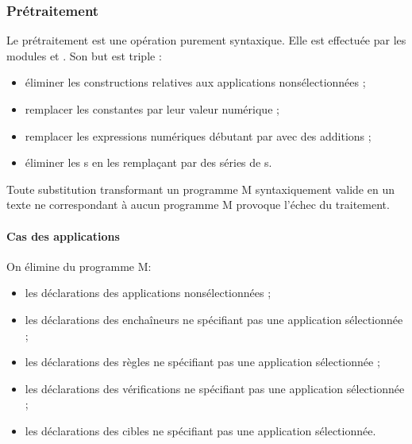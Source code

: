 \documentclass[letterpaper,10pt,french]{sphinxmanual}
\begin{document}
\subsubsection{Pré\sphinxhyphen{}traitement}
\label{\detokenize{mlang:pre-traitement}}
\sphinxAtStartPar
Le prétraitement est une opération purement syntaxique. Elle est effectuée par
les modules  et . Son but est triple :
\begin{itemize}
\item {} 
\sphinxAtStartPar
éliminer les constructions relatives aux applications non\sphinxhyphen{}sélectionnées ;

\item {} 
\sphinxAtStartPar
remplacer les constantes par leur valeur numérique ;

\item {} 
\sphinxAtStartPar
remplacer les expressions numériques débutant par  avec des
additions ;

\item {} 
\sphinxAtStartPar
éliminer les s en les remplaçant par des séries de s.

\end{itemize}

\sphinxAtStartPar
Toute substitution transformant un programme M syntaxiquement valide en un
texte ne correspondant à aucun programme M provoque l’échec du traitement.


\paragraph{Cas des applications}
\label{\detokenize{mlang:cas-des-applications}}
\sphinxAtStartPar
On élimine du programme M:
\begin{itemize}
\item {} 
\sphinxAtStartPar
les déclarations des applications non\sphinxhyphen{}sélectionnées ;

\item {} 
\sphinxAtStartPar
les déclarations des enchaîneurs ne spécifiant pas une application
sélectionnée ;

\item {} 
\sphinxAtStartPar
les déclarations des règles ne spécifiant pas une application
sélectionnée ;

\item {} 
\sphinxAtStartPar
les déclarations des vérifications ne spécifiant pas une application
sélectionnée ;

\item {} 
\sphinxAtStartPar
les déclarations des cibles ne spécifiant pas une application sélectionnée.

\end{itemize}
\end{document}
